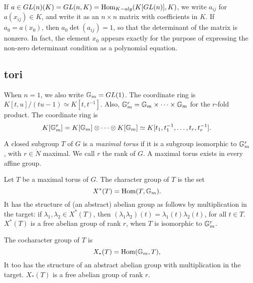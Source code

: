 If $a \in GL(n)(K) = GL(n,K) = \text{Hom}_{K-alg}(K[GL(n)],K)$, we write
$a_{ij}$ for $a(x_{ij})\in K$, and write it as an $n\times n$ matrix
with coefficients in $K$.  If $a_0 = a(x_0)$, then
$a_0\det(a_{ij})=1$, so that the determinant of the matrix is nonzero.
In fact, the element $x_0$ appears exactly for the purpose of
expressing the non-zero determinant condition as a polynomial
equation.


\subsection{tori}\label{subsection-tori}


When $n=1$, we also write ${\Bbb G}_m = GL(1)$.
The coordinate ring is $K[t,u]/(t u - 1)\simeq K[t,t^{-1}]$.
Also, ${\Bbb G}_m^r
={\Bbb G}_m \times \cdots \times {\Bbb G}_m$ for the $r$-fold product.
The coordinate ring is
\[
K[{\Bbb G}_m^r]=K[{\Bbb G}_m]\otimes\cdots\otimes K[{\Bbb G}_m]
\simeq K[t_1,t_1^{-1},\ldots,t_r,t_r^{-1}].
\]


A closed subgroup $T$ of $G$ is a {\it maximal torus} if it is a
subgroup isomorphic to ${\Bbb G}_m^r$, with $r\in\ring{N}$ maximal.  We call
$r$ the rank of $G$.  A maximal torus exists in every affine group.


Let $T$ be a maximal torus of $G$.  The character group of $T$
is the set
\[
X^*(T) = \text{Hom}(T,{\Bbb G}_m).
\]
It has the structure of (an abstract) abelian group as follows
by multiplication in the target:
if $\lambda_1,\lambda_2\in X^*(T)$, then $(\lambda_1\lambda_2)(t) =
\lambda_1(t)\lambda_2(t)$, for all $t\in T$.
$X^*(T)$ is a free abelian group of rank $r$,
when $T$ is isomorphic to ${\Bbb G}_m^r$.

The cocharacter group of $T$ is
\[
X_*(T) = \text{Hom}({\Bbb G}_m,T),
\]
It too has the structure of an abstract abelian group
with multiplication in the target.
$X_*(T)$ is a free abelian group of rank $r$.

